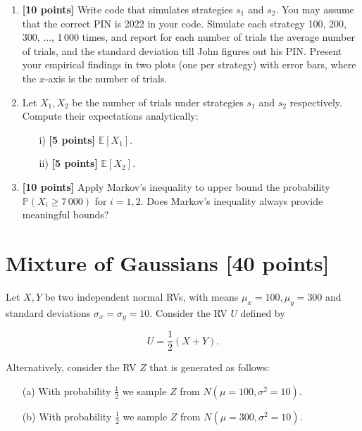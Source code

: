 \begin{tcolorbox}
\begin{enumerate}
    \item  {\bf [10 points] } Write code that simulates strategies $s_1$ and $s_2$. You may assume that the correct PIN is 2022 in your code. Simulate each strategy 100, 200, 300, ..., 1\,000 times, and report for each number of trials the average number of trials, and the standard deviation till John figures out his PIN. Present your empirical findings in two plots (one per strategy) with error bars, where the $x$-axis is the number of trials.  
    \item  Let $X_1,X_2$ be the number of trials under strategies $s_1$ and $s_2$ respectively. Compute their expectations analytically: 
    \begin{itemize}
        \item[i)]   {\bf [5 points] }$ \mathbb{E}[X_1]$.
        \item[ii)]  {\bf [5 points] } $ \mathbb{E}[X_2]$.
    \end{itemize} 


\item  {\bf [10 points] } Apply Markov's inequality to upper bound the probability $\mathbb{P}(X_i \geq 7\,000)$ for $i=1,2$.  Does Markov's inequality always provide meaningful bounds?
\end{enumerate}
\end{tcolorbox}

\newpage 

\section{Mixture of Gaussians [40 points]} 

Let $X,Y$ be two independent normal RVs, with means $\mu_x=100, \mu_y=300$ and standard deviations $\sigma_x=\sigma_y=10$. Consider the RV $U$ defined by 

$$ U = \frac{1}{2}(X+Y).$$


\noindent Alternatively,  consider the RV $Z$ that is generated as follows:

\begin{itemize}
	\item[(a)] With probability $\frac{1}{2}$ we sample $Z$ from $N(\mu=100, \sigma^2=10)$. 
	\item[(b)] With probability $\frac{1}{2}$ we sample $Z$ from $N(\mu=300, \sigma^2=10)$. 
\end{itemize}  


